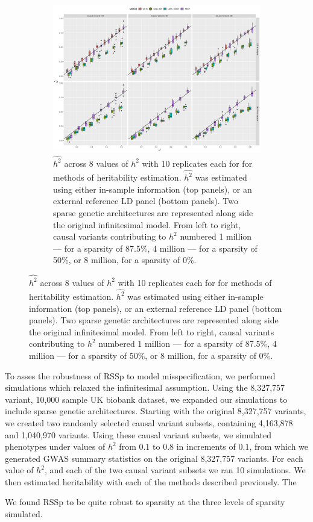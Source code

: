   \begin{figure}
      \centering
  \begin{subfigure}[t]{\textwidth}
    \centering
    \includegraphics[width=.9\linewidth]{img/rssp_sparsity.png}
    \caption{$\hat{h^2}$ across 8 values of $h^2$ with 10 replicates each for for methods of heritability estimation. $\hat{h^2}$ was estimated using either in-sample information (top panels), or an external reference LD panel (bottom panels). Two sparse genetic architectures are represented along side the original infinitesimal model.  From left to right, causal variants contributing to $h^2$ numbered 1 million --- for a sparsity of 87.5\%, 4 million --- for a sparsity of 50\%, or 8 million, for a sparsity of 0\%.}\label{fig:rssp_sp_method_comparison}
  \end{subfigure}
\end{figure}


To asses the robustness of RSSp to model misspecification, we performed simulations which relaxed the infinitesimal assumption.  Using the 8,327,757 variant, 10,000 sample UK biobank dataset, we expanded our simulations to include sparse genetic architectures.  Starting with the original 8,327,757 variants, we created two randomly selected causal variant subsets, containing  4,163,878  and 1,040,970 variants.  Using these causal variant subsets, we simulated phenotypes under values of  $h^2$ from $0.1$ to $0.8$ in increments of $0.1$, from which we generated GWAS summary statistics on the original 8,327,757 variants.  For each value of $h^2$, and each of the two causal variant subsets we ran 10 simulations.  We then estimated heritability with each of the methods described previously.  The 

We found RSSp to be quite robust to sparsity at the three levels of sparsity simulated.  


